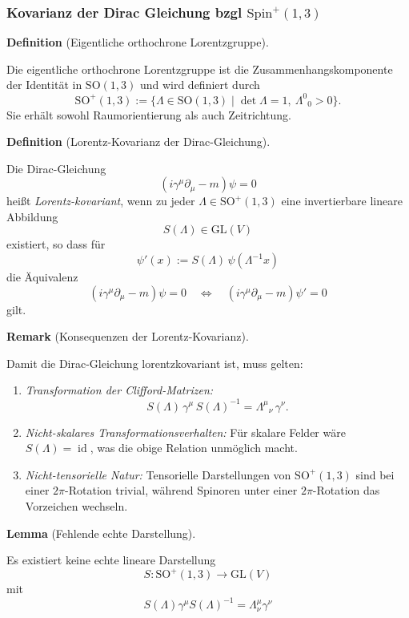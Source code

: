 \documentclass[10pt, letterpaper]{article}
\newcommand{\id}{\operatorname{id}}
\newcommand{\GL}{\mathrm{GL}}
\newcommand{\SO}{\mathrm{SO}}
\newcommand{\Spin}{\mathrm{Spin}}
\newcommand{\CustomHeading}[3]{%
  \par\medskip\noindent%
  \textbf{#1 #2} \textnormal{(#3)}.\enskip%
}
\newenvironment{DEF}[2]{\CustomHeading{Definition}{#1}{#2}}{}
\newenvironment{LEM}[2]{\CustomHeading{Lemma}{#1}{#2}}{}
\newenvironment{REM}[2]{\CustomHeading{Remark}{#1}{#2}}{}
\begin{document}
\subsubsection{Kovarianz der Dirac Gleichung bzgl $\Spin^+(1,3)$}

\begin{DEF}{}{Eigentliche orthochrone Lorentzgruppe}
Die eigentliche orthochrone Lorentzgruppe ist die Zusammenhangskomponente
der Identität in $\SO(1,3)$ und wird definiert durch
\[
\SO^{+}(1,3)
:=\{\Lambda\in\SO(1,3)\mid \det\Lambda=1,\ \Lambda^0{}_0>0\}.
\]
Sie erhält sowohl Raumorientierung als auch Zeitrichtung.
\end{DEF}

\begin{DEF}{}{Lorentz-Kovarianz der Dirac-Gleichung}
Die Dirac-Gleichung
\[
(i\gamma^\mu\partial_\mu - m)\psi = 0
\]
heißt \emph{Lorentz-kovariant}, wenn zu jeder
$\Lambda\in\SO^{+}(1,3)$ eine invertierbare lineare Abbildung
\[
S(\Lambda)\in\GL(V)
\]
existiert, so dass für
\[
\psi'(x):=S(\Lambda)\,\psi(\Lambda^{-1}x)
\]
die Äquivalenz
\[
(i\gamma^\mu\partial_\mu - m)\psi = 0
\quad\Longleftrightarrow\quad
(i\gamma^\mu\partial_\mu - m)\psi' = 0
\]
gilt.
\end{DEF}

\begin{REM}{}{Konsequenzen der Lorentz-Kovarianz}
Damit die Dirac-Gleichung lorentzkovariant ist, muss gelten:
\begin{enumerate}
\item \emph{Transformation der Clifford-Matrizen:}
\[
S(\Lambda)\,\gamma^\mu\,S(\Lambda)^{-1}
= \Lambda^\mu{}_\nu\,\gamma^\nu.
\]

\item \emph{Nicht-skalares Transformationsverhalten:}
Für skalare Felder wäre $S(\Lambda)=\id$, was die obige Relation unmöglich macht.

\item \emph{Nicht-tensorielle Natur:}
Tensorielle Darstellungen von $\SO^{+}(1,3)$ sind bei einer $2\pi$-Rotation trivial,
während Spinoren unter einer $2\pi$-Rotation das Vorzeichen wechseln.
\end{enumerate}
\end{REM}

\begin{LEM}{}{Fehlende echte Darstellung}
Es existiert keine echte lineare Darstellung
\[
S:\SO^{+}(1,3)\to\GL(V)
\]
mit
$$S(\Lambda) \gamma^\mu S(\Lambda)^{-1}=\Lambda_\nu^\mu \gamma^\nu$$
\end{LEM}
\end{document}
